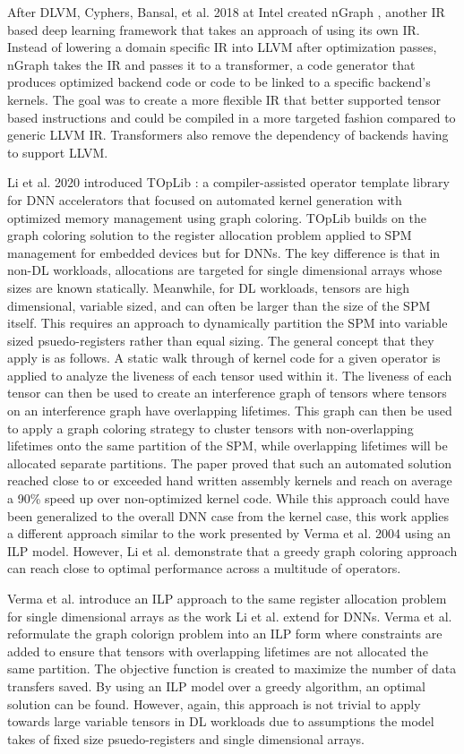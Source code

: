 After DLVM, Cyphers, Bansal, et al. 2018 at Intel created nGraph \cite{nGraph},
another IR based deep learning framework that takes an approach of using its
own IR. Instead of lowering a domain specific IR into LLVM after optimization
passes, nGraph takes the IR and passes it to a transformer, a code generator
that produces optimized backend code or code to be linked to a specific
backend's kernels. The goal was to create a more flexible IR that better supported
tensor based instructions and could be compiled in a more targeted fashion compared
to generic LLVM IR. Transformers also remove the dependency of backends having
to support LLVM.

Li et al. 2020 introduced TOpLib \cite{toplib}: a compiler-assisted operator
template library for DNN accelerators that focused on automated kernel
generation with optimized memory management using graph coloring. TOpLib builds
on the graph coloring solution to the register allocation problem applied to
SPM management for embedded devices but for DNNs. The key difference is that in
non-DL workloads, allocations are targeted for single dimensional arrays whose
sizes are known statically. Meanwhile, for DL workloads, tensors are high
dimensional, variable sized,  and can often be larger than the size of the SPM
itself.  This requires an approach to dynamically partition the SPM into
variable sized psuedo-registers rather than equal sizing. The general concept
that they apply is as follows. A static walk through of kernel code for a given
operator is applied to analyze the liveness of each tensor used within it.  The
liveness of each tensor can then be used to create an interference graph of
tensors where tensors on an interference graph have overlapping lifetimes.
This graph can then be used to apply a graph coloring strategy to cluster
tensors with non-overlapping lifetimes onto the same partition of the SPM,
while overlapping lifetimes will be allocated separate partitions. The paper
proved that such an automated solution reached close to or exceeded hand
written assembly kernels and reach on average a 90\% speed up over
non-optimized kernel code.  While this approach could have been generalized to
the overall DNN case from the kernel case, this work applies a different
approach similar to the work presented by Verma et al. 2004 using an ILP model.
However, Li et al. demonstrate that a greedy graph coloring approach can reach
close to optimal performance across a multitude of operators.

Verma et al. \cite{verma} introduce an ILP approach to the same register
allocation problem for single dimensional arrays as the work Li et al. extend
for DNNs. Verma et al.  reformulate the graph colorign problem into an ILP form
where constraints are added to ensure that tensors with overlapping lifetimes
are not allocated the same partition. The objective function is created to
maximize the number of data transfers saved. By using an ILP model over a
greedy algorithm, an optimal solution can be found. However, again, this
approach is not trivial to apply towards large variable tensors in DL workloads
due to assumptions the model takes of fixed size psuedo-registers and single
dimensional arrays.

